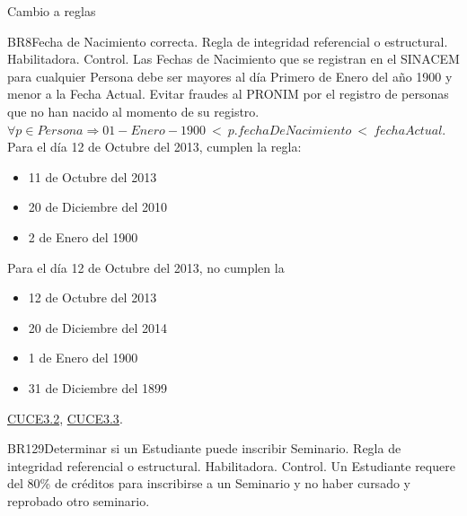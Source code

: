 Cambio a reglas
\begin{BussinesRule}{BR8}{Fecha de Nacimiento correcta.}
	\BRitem[Tipo:] Regla de integridad referencial o estructural. 
	\BRitem[Clase:] Habilitadora. 
	\BRitem[Nivel:] Control. %
	\BRitem[Descripción:]	Las Fechas de Nacimiento que se registran en el SINACEM para cualquier Persona debe ser mayores al día Primero de Enero del año 1900 y menor a la Fecha Actual.
	\BRitem[Motivación:] Evitar fraudes al PRONIM por el registro de personas que no han nacido al momento de su registro.
	\BRitem[Sentencia:] $\forall p \in Persona \Rightarrow 01-Enero-1900~<~p.fechaDeNacimiento~<~fechaActual$.
	 Para el día 12 de Octubre del 2013, cumplen la regla: 		
        \begin{itemize}
        	\item 11 de Octubre del 2013
			\item 20 de Diciembre del 2010
			\item 2 de Enero del 1900
        \end{itemize}
	
	 Para el día 12 de Octubre del 2013, no cumplen la 
		\begin{itemize}
        	\item 12 de Octubre del 2013
			\item 20 de Diciembre del 2014
			\item 1 de Enero del 1900
			\item 31 de Diciembre del 1899
        \end{itemize}
	
	 \hyperlink{CUCE3.2}{CUCE3.2}, \hyperlink{CUCE3.3}{CUCE3.3}.
\end{BussinesRule}

\begin{BussinesRule}{BR129}{Determinar si un Estudiante puede inscribir Seminario.} 
	\BRitem[Tipo:] Regla de integridad referencial o estructural. 
	\BRitem[Clase:] Habilitadora. 
	\BRitem[Nivel:] Control. %
	\BRitem[Descripción:] Un Estudiante requere del 80\% de créditos para inscribirse a un Seminario y no haber cursado y reprobado otro seminario.
	
	
\end{BussinesRule}

